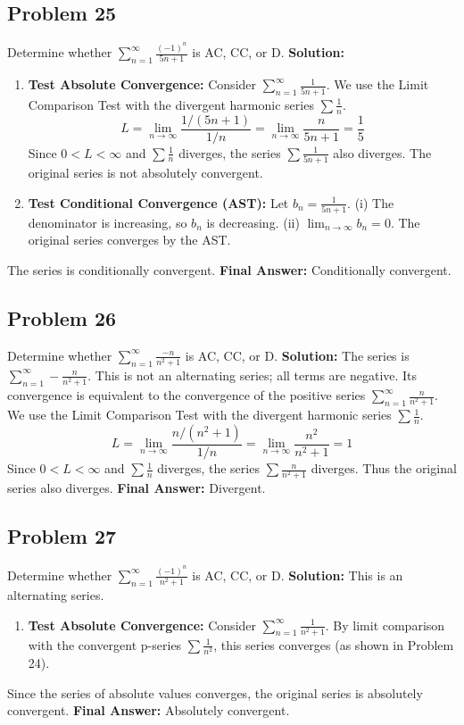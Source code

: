 \documentclass{article}
\begin{document}
\subsection*{Problem 25}
Determine whether $\sum_{n=1}^{\infty} \frac{(-1)^n}{5n+1}$ is AC, CC, or D.
\textbf{Solution:}
\begin{enumerate}
    \item \textbf{Test Absolute Convergence:} Consider $\sum_{n=1}^{\infty} \frac{1}{5n+1}$. We use the Limit Comparison Test with the divergent harmonic series $\sum \frac{1}{n}$.
    \[ L = \lim_{n \to \infty} \frac{1/(5n+1)}{1/n} = \lim_{n \to \infty} \frac{n}{5n+1} = \frac{1}{5} \]
    Since $0 < L < \infty$ and $\sum \frac{1}{n}$ diverges, the series $\sum \frac{1}{5n+1}$ also diverges. The original series is not absolutely convergent.
    \item \textbf{Test Conditional Convergence (AST):} Let $b_n = \frac{1}{5n+1}$.
    (i) The denominator is increasing, so $b_n$ is decreasing.
    (ii) $\lim_{n \to \infty} b_n = 0$.
    The original series converges by the AST.
\end{enumerate}
The series is conditionally convergent.
\textbf{Final Answer:} Conditionally convergent.

\subsection*{Problem 26}
Determine whether $\sum_{n=1}^{\infty} \frac{-n}{n^2+1}$ is AC, CC, or D.
\textbf{Solution:} The series is $\sum_{n=1}^{\infty} - \frac{n}{n^2+1}$. This is not an alternating series; all terms are negative. Its convergence is equivalent to the convergence of the positive series $\sum_{n=1}^{\infty} \frac{n}{n^2+1}$. We use the Limit Comparison Test with the divergent harmonic series $\sum \frac{1}{n}$.
\[ L = \lim_{n \to \infty} \frac{n/(n^2+1)}{1/n} = \lim_{n \to \infty} \frac{n^2}{n^2+1} = 1 \]
Since $0 < L < \infty$ and $\sum \frac{1}{n}$ diverges, the series $\sum \frac{n}{n^2+1}$ diverges. Thus the original series also diverges.
\textbf{Final Answer:} Divergent.

\subsection*{Problem 27}
Determine whether $\sum_{n=1}^{\infty} \frac{(-1)^n}{n^2+1}$ is AC, CC, or D.
\textbf{Solution:} This is an alternating series.
\begin{enumerate}
    \item \textbf{Test Absolute Convergence:} Consider $\sum_{n=1}^{\infty} \frac{1}{n^2+1}$. By limit comparison with the convergent p-series $\sum \frac{1}{n^2}$, this series converges (as shown in Problem 24).
\end{enumerate}
Since the series of absolute values converges, the original series is absolutely convergent.
\textbf{Final Answer:} Absolutely convergent.
\end{document}
